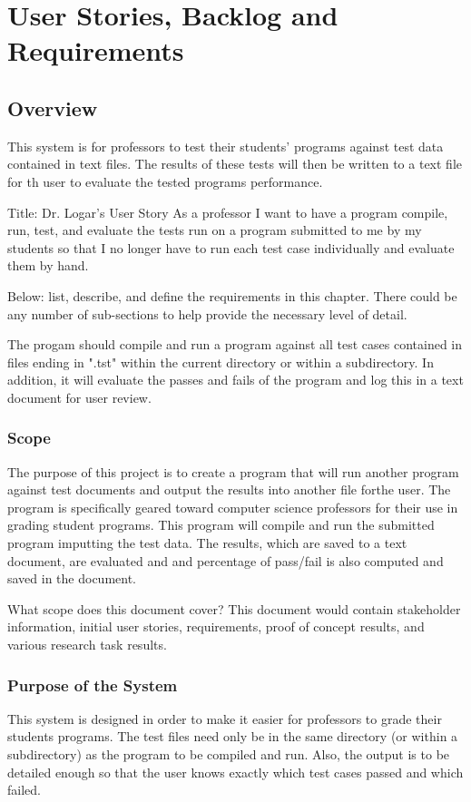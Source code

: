 \chapter{User Stories, Backlog and Requirements}
\section{Overview}


This system is for professors to test their students' programs against test data contained in text files. The results of these
tests will then be written to a text file for th user to evaluate the tested programs performance.

 Title: Dr. Logar's User Story
As a professor I want to have a program compile, run, test, and evaluate the tests run on a program submitted to me by 
my students so that I no longer have to run each test case individually and evaluate them by hand.

Below:   list, describe, and define the requirements in this chapter.  
There could be any number of sub-sections to help provide the necessary level of 
detail. 


The progam should compile and run a program against all test cases contained in files ending in ".tst" within the current 
directory or within a subdirectory. In addition, it will evaluate the passes and fails of the program and log this in a text 
document for user review.


\subsection{Scope}
The purpose of this project is to create a program that will run another program against test documents and output the 
results into another file forthe user. The program is specifically geared toward computer science professors for their use in 
grading student programs. This program will compile and run the submitted program imputting the test data. The results, which are saved to a text document, are evaluated and and percentage of pass/fail is also computed and saved in the
document.

What scope does this document cover?  This document would contain stakeholder information, 
initial user stories, requirements, proof of concept results, and various research 
task results. 



\subsection{Purpose of the System}
This system is designed in order to make it easier for professors to grade their students programs. The test files need only be 
in the same directory (or within a subdirectory) as the program to be compiled and run. Also, the output is to be detailed 
enough so that the user knows exactly which test cases passed and which failed.


